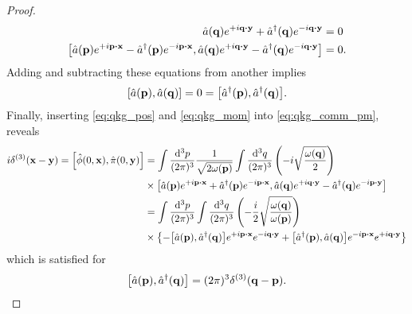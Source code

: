 \begin{proof}
\begin{align*}
{		}{
			\hat{a}(\vb{q})
			e^{+i\vb{q}\vdot\vb{y}}
			+
			\hat{a}^\dagger(\vb{q})
			e^{-i\vb{q}\vdot\vb{y}}
		}
		&=
		0
		\\
		\comm{
			\hat{a}(\vb{p})
			e^{+i\vb{p}\vdot\vb{x}}
			-
			\hat{a}^\dagger(\vb{p})
			e^{-i\vb{p}\vdot\vb{x}}
		}{
			\hat{a}(\vb{q})
			e^{+i\vb{q}\vdot\vb{y}}
			-
			\hat{a}^\dagger(\vb{q})
			e^{-i\vb{q}\vdot\vb{y}}
		}
		&=
		0
		.
	\end{align*}
	Adding and subtracting these equations from another implies
	\begin{equation*}
		\comm{\hat{a}(\vb{p})}{\hat{a}(\vb{q})}
		=
		0
		=
		\comm{\hat{a}^\dagger(\vb{p})}{\hat{a}^\dagger(\vb{q})}
		.
	\end{equation*}
	Finally, inserting \cref{eq:qkg_pos} and \cref{eq:qkg_mom} into \cref{eq:qkg_comm_pm}, reveals
	\begin{equation*}
		\begin{split}
			i\delta^{(3)}(\vb{x}-\vb{y})
			=
			\comm{\hat\phi(0,\vb{x})}{\hat\pi(0,\vb{y})}
			&=
			\int\frac{\dd[3]{p}}{(2\pi)^3}
			\frac{1}{\sqrt{2\omega(\vb{p})}}
			\int\frac{\dd[3]{q}}{(2\pi)^3}
			\left(
				-i
				\sqrt{\frac{\omega(\vb{q})}{2}}
			\right)
			\\
			&\times
			\comm{
				\hat{a}(\vb{p})
				e^{+i\vb{p}\vdot\vb{x}}
				+
				\hat{a}^\dagger(\vb{p})
				e^{-i\vb{p}\vdot\vb{x}}
			}{
				\hat{a}(\vb{q})
				e^{+i\vb{q}\vdot\vb{y}}
				-
				\hat{a}^\dagger(\vb{q})
				e^{-i\vb{p}\vdot\vb{y}}
			}
			\\
			&=
			\int\frac{\dd[3]{p}}{(2\pi)^3}
			\int\frac{\dd[3]{q}}{(2\pi)^3}
			\left(
				-
				\frac{i}{2}
				\sqrt{\frac{\omega(\vb{q})}{\omega(\vb{p})}}
			\right)
			\\
			&\times
			\left\{
				-
				\comm{\hat{a}(\vb{p})}{\hat{a}^\dagger(\vb{q})}
				e^{+i\vb{p}\vdot\vb{x}}
				e^{-i\vb{q}\vdot\vb{y}}
				+
				\comm{\hat{a}^\dagger(\vb{p})}{\hat{a}(\vb{q})}
				e^{-i\vb{p}\vdot\vb{x}}
				e^{+i\vb{q}\vdot\vb{y}}
			\right\}
		\end{split}
	\end{equation*}
	which is satisfied for
	\begin{equation*}
		\comm{\hat{a}(\vb{p})}{\hat{a}^\dagger(\vb{q})}
		=
		(2\pi)^3
		\delta^{(3)}(\vb{q}-\vb{p})
		.
	\end{equation*}
\end{proof}


